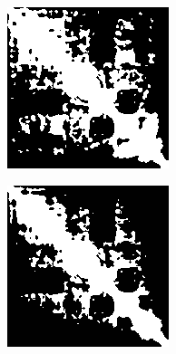 \documentclass{article}
\begin{document}
\begin{figure}[H]
\begin{subfigure}[b]{.45\textwidth}
        \includegraphics[width=\textwidth]{figures/MIT_60per_thresh.png}
        \caption{}
        \label{fig:mit_thresh}
    \end{subfigure}
    \begin{subfigure}[b]{.45\textwidth}
        \includegraphics[width=\textwidth]{figures/ALL_MIT_common.png}

\end{subfigure}
\end{figure}
\end{document}
